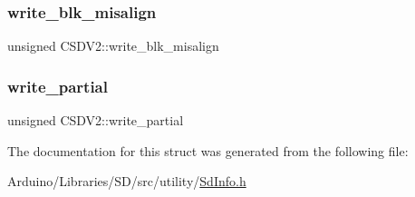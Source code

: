 \mbox{\label{struct_c_s_d_v2_a581efcca315ea376735dd9ca7f5172a8}} 
\subsubsection{\texorpdfstring{write\+\_\+blk\+\_\+misalign}{write\_blk\_misalign}}
{\footnotesize\ttfamily unsigned C\+S\+D\+V2\+::write\+\_\+blk\+\_\+misalign}

\mbox{\label{struct_c_s_d_v2_a5bdeb28b6b264d0da4d881881d135c7a}} 
\subsubsection{\texorpdfstring{write\+\_\+partial}{write\_partial}}
{\footnotesize\ttfamily unsigned C\+S\+D\+V2\+::write\+\_\+partial}



The documentation for this struct was generated from the following file\+:\begin{DoxyCompactItemize}
\item 
Arduino/\+Libraries/\+S\+D/src/utility/\hyperlink{_sd_info_8h}{Sd\+Info.\+h}\end{DoxyCompactItemize}
